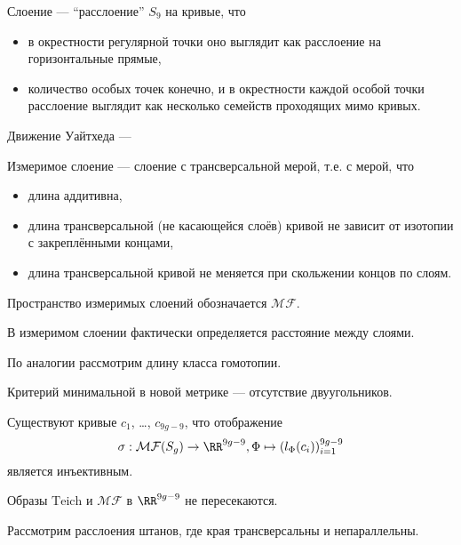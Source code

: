 \documentclass[12pt,a4paper]{article}
\newcommand{\Teich}{\mathrm{Teich}}
\newcommand{\MF}{\mathcal{MF}}
\begin{document}
    \begin{definition}
        Слоение --- ``расслоение'' $S_9$ на кривые, что
        \begin{itemize}
            \item в окрестности регулярной точки оно выглядит как расслоение на горизонтальные прямые,
            \item количество особых точек конечно, и в окрестности каждой особой точки расслоение выглядит как несколько семейств проходящих мимо кривых.
        \end{itemize}

        Движение Уайтхеда --- 

        Измеримое слоение --- слоение с трансверсальной мерой, т.е. с мерой, что
        \begin{itemize}
            \item длина аддитивна,
            \item длина трансверсальной (не касающейся слоёв) кривой не зависит от изотопии с закреплёнными концами,
            \item длина трансверсальной кривой не меняется при скольжении концов по слоям.
        \end{itemize}

        Пространство измеримых слоений обозначается $\MF$.
    \end{definition}

    \begin{remark}
        В измеримом слоении фактически определяется расстояние между слоями.
    \end{remark}

    По аналогии рассмотрим длину класса гомотопии.

    \begin{lemma}
        Критерий минимальной в новой метрике --- отсутствие двуугольников.
    \end{lemma}

    \begin{theorem}
        Существуют кривые $c_1$, \dots, $c_{9g-9}$, что отображение
        \[\sigma: \MF(S_g) \to \RR^{9g-9}, \Phi \mapsto (l_\Phi(c_i))_{i=1}^{9g-9}\]
        является инъективным. 
    \end{theorem}

    \begin{lemma}
        Образы $\Teich$ и $\MF$ в $\RR^{9g-9}$ не пересекаются.
    \end{lemma}

    \begin{problem}
        Рассмотрим расслоения штанов, где края трансверсальны и непараллельны.
    \end{problem}
\end{document}
